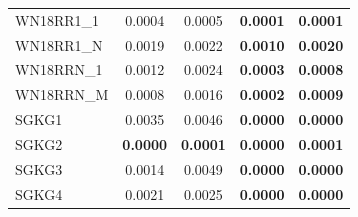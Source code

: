 \begin{table}[t]
{\begin{tabular}{l||cc||cc}
WN18RR1\_1 & 0.0004 & 0.0005 & \textbf{0.0001} & \textbf{0.0001} \\
WN18RR1\_N & 0.0019 & 0.0022 & \textbf{0.0010} & \textbf{0.0020} \\
WN18RRN\_1 & 0.0012 & 0.0024 & \textbf{0.0003} & \textbf{0.0008} \\
WN18RRN\_M & 0.0008 & 0.0016 & \textbf{0.0002} & \textbf{0.0009} \\
\hline
SGKG1 & 0.0035 & 0.0046 & \textbf{0.0000} & \textbf{0.0000} \\
SGKG2 & \textbf{0.0000} & \textbf{0.0001} & \textbf{0.0000} & \textbf{0.0001} \\
SGKG3 & 0.0014 & 0.0049 & \textbf{0.0000} & \textbf{0.0000} \\
SGKG4 & 0.0021 & 0.0025 & \textbf{0.0000} & \textbf{0.0000} \\
\hline
\end{tabular}%
}
\end{table}
